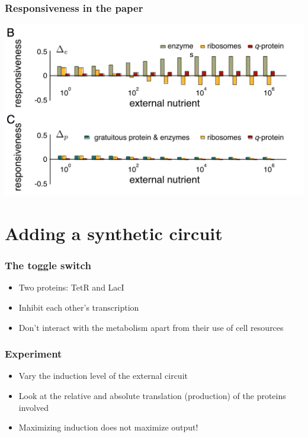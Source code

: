 \documentclass{beamer}
\begin{document}
\begin{frame}
\frametitle{Responsiveness in the paper}
\includegraphics[width=\textwidth]{resp.png}
\end{frame}

\section{Adding a synthetic circuit}

\begin{frame}
\tableofcontents[currentsection]
\end{frame}

\begin{frame}
\frametitle{The toggle switch}
\begin{itemize}
\item Two proteins: TetR and LacI
\item Inhibit each other's transcription
\item Don't interact with the metabolism apart from their use of cell resources
\end{itemize}
\end{frame}

\begin{frame}
\frametitle{Experiment}
\begin{itemize}
\item Vary the induction level of the external circuit
\item Look at the relative and absolute translation (production) of the proteins involved
\item Maximizing induction does not maximize output!
\end{itemize}
\end{frame}
\end{document}
